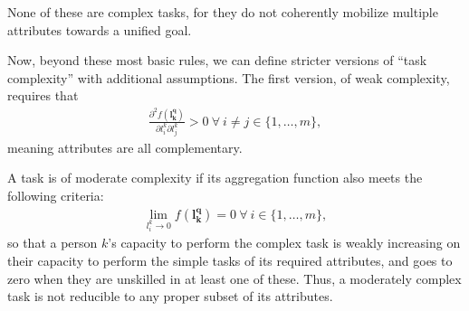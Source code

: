 \documentclass[hidelinks, nonatbib]{elsarticle}
\begin{document}
\begin{definition}
    None of these are complex tasks, for they do not coherently mobilize multiple attributes towards a unified goal.
    
    \begin{subdefinition}
        Now, beyond these most basic rules, we can define stricter versions of ``task complexity'' with additional assumptions. The first version, of weak complexity, requires that
        \begin{gather}
            \frac{
                \partial ^ 2 {f(\boldsymbol{l_{k}^{q}})}
            }{
                \partial 
                l_{i}^{k}
                \partial
                l_{j}^{k}
            }
            > 0
            \
            \forall
            \
            i \neq j \in \{1, \dots, m\}
            ,
        \end{gather}
        meaning attributes are all complementary.
    \end{subdefinition}
    
    \begin{subdefinition}
        A task is of moderate complexity if its aggregation function also meets the following criteria:
        \begin{gather}
            \lim_{
                l_{i}^{k} \rightarrow 0
            }{
                f(\boldsymbol{l_{k}^{q}})
            } = 0
            \
            \forall 
            \
            i \in \{1, \dots, m\}
            ,
        \end{gather}
        so that a person $k$'s capacity to perform the complex task is weakly increasing on their capacity to perform the simple tasks of its required attributes, and goes to zero when they are unskilled in at least one of these. Thus, a moderately complex task is not reducible to any proper subset of its attributes.
        

\end{subdefinition}
\end{definition}
\end{document}
